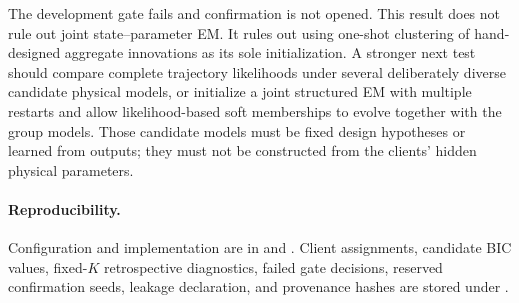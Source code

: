The development gate fails and confirmation is not opened. This result does
not rule out joint state--parameter EM. It rules out using one-shot clustering
of hand-designed aggregate innovations as its sole initialization. A stronger
next test should compare complete trajectory likelihoods under several
deliberately diverse candidate physical models, or initialize a joint
structured EM with multiple restarts and allow likelihood-based soft
memberships to evolve together with the group models. Those candidate models
must be fixed design hypotheses or learned from outputs; they must not be
constructed from the clients' hidden physical parameters.

\paragraph{Reproducibility.}
Configuration and implementation are in
 and
.
Client assignments, candidate BIC values, fixed-$K$ retrospective diagnostics,
failed gate decisions, reserved confirmation seeds, leakage declaration, and
provenance hashes are stored under .
